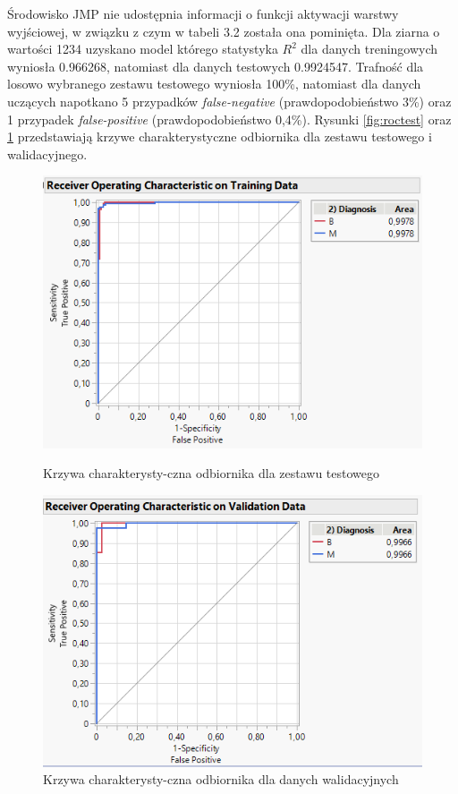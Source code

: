 Środowisko JMP nie udostępnia informacji o funkcji aktywacji warstwy wyjściowej, w związku z czym w tabeli 3.2 została ona pominięta. Dla ziarna o wartości 1234 uzyskano model którego statystyka $R^{2}$ dla danych treningowych wyniosła 0.966268, natomiast dla danych testowych 0.9924547. Trafność dla losowo wybranego zestawu testowego wyniosła 100\%, natomiast dla danych uczących napotkano 5 przypadków \textit{false-negative} (prawdopodobieństwo 3\%) oraz 1 przypadek \textit{false-positive} (prawdopodobieństwo 0,4\%). Rysunki \ref{fig:roctest} oraz \ref{fig:rocvalid} przedstawiają krzywe charakterystyczne odbiornika dla zestawu testowego i walidacyjnego.

\begin{figure}[!ht]
	\begin{minipage}{0.48\textwidth}
			\centering
			\includegraphics[width=0.95\linewidth]{Rysunki/Rozdzial3/roc_test}
			\caption{Krzywa charakterysty-czna odbiornika dla zestawu testowego}
			\label{fig:roctest}
	\end{minipage}%
	\hspace{8pt}
	\begin{minipage}{0.48\textwidth}
			\centering
			\includegraphics[width=0.95\linewidth]{Rysunki/Rozdzial3/roc_valid}
			\caption{Krzywa charakterysty-czna odbiornika dla danych walidacyjnych}
			\label{fig:rocvalid}
	\end{minipage}
\end{figure}

